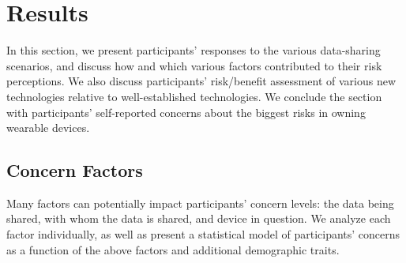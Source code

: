 \section{Results}
In this section, we present participants' responses to the various data-sharing scenarios, and discuss how and which various factors contributed to their risk perceptions. We also discuss participants' risk/benefit assessment of various new technologies relative to well-established technologies. We conclude the section with participants' self-reported concerns about the biggest risks in owning wearable devices.

\subsection{Concern Factors}
Many factors can potentially impact participants' concern levels:  the data being shared, with whom the data is shared, and device in question. We analyze each factor individually, as well as present a statistical model of participants' concerns as a function of the above factors and additional demographic traits.